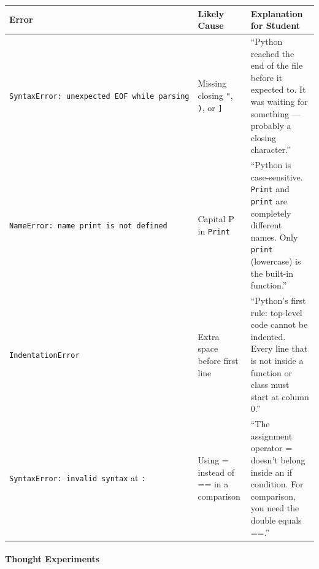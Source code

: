 \documentclass[
  justified,
  openright,
]{tufte-book}
\let\paragraph\paragraph
\let\paragraph\paragraph
\begin{document}
{\def\LTcaptype{none} %
\begin{longtable}[]{@{}
  >{\raggedright\arraybackslash}p{}
  >{\raggedright\arraybackslash}p{}
  >{\raggedright\arraybackslash}p{}@{}}
\toprule\noalign{}
\begin{minipage}[b]{\linewidth}\raggedright
Error
\end{minipage} & \begin{minipage}[b]{\linewidth}\raggedright
Likely Cause
\end{minipage} & \begin{minipage}[b]{\linewidth}\raggedright
Explanation for Student
\end{minipage} \\
\midrule\noalign{}
\endhead
\bottomrule\noalign{}
\endlastfoot
\texttt{SyntaxError:\ unexpected\ EOF\ while\ parsing} & Missing closing
\texttt{"}, \texttt{)}, or \texttt{{]}} & ``Python reached the end of
the file before it expected to. It was waiting for something ---
probably a closing character.'' \\
\texttt{NameError:\ name\ \textquotesingle{}print\textquotesingle{}\ is\ not\ defined}
& Capital P in \texttt{Print} & ``Python is case-sensitive.
\texttt{Print} and \texttt{print} are completely different names. Only
\texttt{print} (lowercase) is the built-in function.'' \\
\texttt{IndentationError} & Extra space before first line & ``Python's
first rule: top-level code cannot be indented. Every line that is not
inside a function or class must start at column 0.'' \\
\texttt{SyntaxError:\ invalid\ syntax} at \texttt{:} & Using = instead
of == in a comparison & ``The assignment operator = doesn't belong
inside an if condition. For comparison, you need the double equals
==.'' \\
\end{longtable}
}

\paragraph{Thought Experiments}\label{thought-experiments-5}
\end{document}

